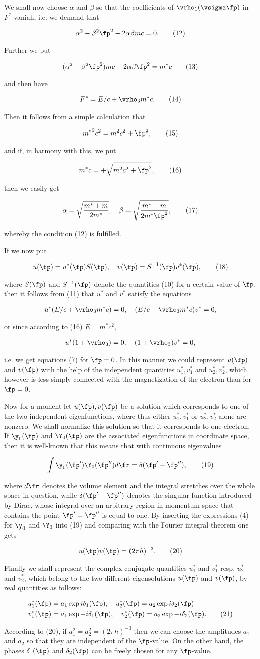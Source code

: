 \documentclass{article}
\newcommand{\nequ}[2]{
\begin{align*}
#1
\tag{#2}
\end{align*}
}
\newcommand{\uequ}[1]{
\begin{align*}
#1
\end{align*}
}
\begin{document}
We shall now choose $\alpha$ and $\beta$ so that the coefficients of $\vrho_1(\vsigma\fp)$ in $F^*$ vaniah, i.e. we demand that
\nequ{
\alpha^2 - \beta^2 \fp^2 - 2\alpha\beta mc = 0.
}{12}
Further we put
\nequ{
(\alpha^2 - \beta^2 \fp^2)mc + 2\alpha\beta\fp^2 = m^* c
}{13}
and then have
\nequ{
F^* = E/c + \vrho_3 m^* c.
}{14}
Then it follows from a simple calculation that
\nequ{
{m^*}^2 c^2 = m^2 c^2 + \fp^2,
}{15}
and if, in harmony with this, we put
\nequ{
m^* c = +\sqrt{m^2 c^2 + \fp^2},
}{16}
then we easily get
\nequ{
\alpha = \sqrt{\frac{m^* + m}{2m^*}},\quad
 \beta = \sqrt{\frac{m^* - m}{2m^*\fp^2}},
}{17}
whereby the condition (12) is fulfilled.

If we now put
\nequ{
u(\fp) = u^*(\fp)S(\fp),\quad v(\fp) = S^{-1}(\fp)v^*(\fp),
}{18}
where $S(\fp)$ and $S^{-1}(\fp)$ denote the quantities (10) for a certain value of $\fp$, then it follows from (11) that $u^*$ and $v^*$ satisfy the equations
\uequ{
u^*(E/c + \vrho_3 m^* c) = 0,\quad
(E/c + \vrho_3 m^* c)v^* = 0,
}
or since according to (16) $E=m^*c^2$,
\uequ{
u^*(1+\vrho_3) = 0,\quad
(1+\vrho_3)v^* = 0,
}
i.e. we get equations (7) for $\fp=0$. In this manner we could represent $u(\fp)$ and $v(\fp)$ with the help of the independent quantities $u_1^*, v_1^*$ and $u_2^*,v_2^*$, which however is less simply connected with the magnetization of the electron than for $\fp=0$.

Now for a moment let $u(\fp),v(\fp)$ be a solution which corresponds to one of the two independent eigenfunctions, where thus either $u^*_1,v^*_1$ or $u^*_2,v^*_2$ alone are nonzero. We shall normalize this solution so that it corresponds to one electron. If $\y_0(\fp)$ and $\Y_0(\fp)$ are the associated eigenfunctions in coordinate space, then it is well-known that this means that with continuous eigenvalues
\nequ{
\int{\y_0(\fp')\Y_0(\fp''){d\fr}} = \delta(\fp'-\fp''),
}{19}
where ${d\fr}$ denotes the volume element and the integral stretches over the whole space in question, while $\delta(\fp'-\fp'')$ denotes the singular function introduced by Dirac, whose integral over an arbitrary region in momentum space that contains the point $\fp'=\fp''$ is equal to one. By inserting the expressions (4) for $\y_0$ and $\Y_0$ into (19) and comparing with the Fourier integral theorem one gets
\nequ{
u(\fp)v(\fp) = (2\pi h)^{-3}.
}{20}

Finally we shall represent the complex conjugate quantities $u_1^*$ and $v_1^*$ resp. $u_2^*$ and $v_2^*$, which belong to the two different eigensolutions $u(\fp)$ and $v(\fp)$, by real quantities as follows:
\nequ{
u^*_1(\fp) &= a_1 \exp{i\delta_1(\fp)},  \quad u_2^*(\fp) = a_2 \exp{i\delta_2(\fp)}\\
v^*_1(\fp) &= a_1 \exp{-i\delta_1(\fp)}, \quad v_2^*(\fp) = a_2 \exp{-i\delta_2(\fp)}.
}{21}
According to (20), if $a_1^2 = a_2^2 = (2\pi h)^{-3}$ then we can choose the amplitudes $a_1$ and $a_2$ so that they are independent of the $\fp$-value. On the other hand, the phases $\delta_1(\fp)$ and $\delta_2(\fp)$ can be freely chosen for any $\fp$-value.
\end{document}
